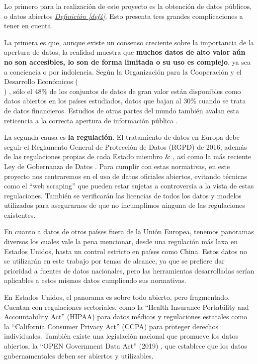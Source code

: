 Lo primero para la realización de este proyecto es la obtención de datos públicos, o datos abiertos \hyperref[def4]{\textit{Definición \ref*{def4}}}. Esto presenta tres grandes complicaciones a tener en cuenta.

La primera es que, aunque existe un consenso creciente sobre la importancia de la apertura de datos, la realidad muestra que \textbf{muchos datos de alto valor aún no son accesibles, lo son de forma limitada o su uso es complejo}, ya sea a conciencia o por indolencia. Según la Organización para la Cooperación y el Desarrollo Económicos (\\
) \citep{OECD2023openData}, sólo el 48\% de los conjuntos de datos de gran valor están disponibles como datos abiertos en los países estudiados, datos que bajan al 30\% cuando se trata de datos financieros. Estudios de otras partes del mundo también avalan esta reticencia a la correcta apertura de información pública \citep{TransparenciaEcuador, TransparenciaMexico}.

La segunda causa es \textbf{la regulación}. El tratamiento de datos en Europa debe seguir el Reglamento General de Protección de Datos (RGPD) de 2016, además de las regulaciones propias de cada Estado miembro \citep{LicenciasLibres2017Datos} \& \citep{webRGPD2016Europa}, así como la más reciente Ley de Gobernanza de Datos \citep{webLGD2023Europa, DatosAbiertos2022Cloud}. Para cumplir con estas normativas, en este proyecto nos centraremos en el uso de datos oficiales abiertos, evitando técnicas como el ``web scraping'' que pueden estar sujetas a controversia a la vista de estas regulaciones. También se verificarán las licencias de todos los datos y modelos utilizados para asegurarnos de que no incumplimos ninguna de las regulaciones existentes.

En cuanto a datos de otros países fuera de la Unión Europea, tenemos panoramas diversos los cuales vale la pena mencionar, desde una regulación más laxa en Estados Unidos, hasta un control estricto en países como China. Estos datos no se utilizarán en este trabajo por temas de alcance, ya que se prefiere dar prioridad a fuentes de datos nacionales, pero las herramientas desarrolladas serían aplicables a estos mismos datos cumpliendo sus normativas.

En Estados Unidos, el panorama es sobre todo abierto, pero fragmentado. Cuentan con regulaciones sectoriales, como la ``Health Insurance Portability and Accountability Act'' (HIPAA) para datos médicos \citep{webHIPAA1996EEUU} y regulaciones estatales como la ``California Consumer Privacy Act'' (CCPA) \citep{webCCPA2018California} para proteger derechos individuales. También existe una legislación nacional que promueve los datos abiertos, la ``OPEN Government Data Act'' (2019) \citep{webOGDA2019EEUU}, que establece que los datos gubernamentales deben ser abiertos y utilizables.

